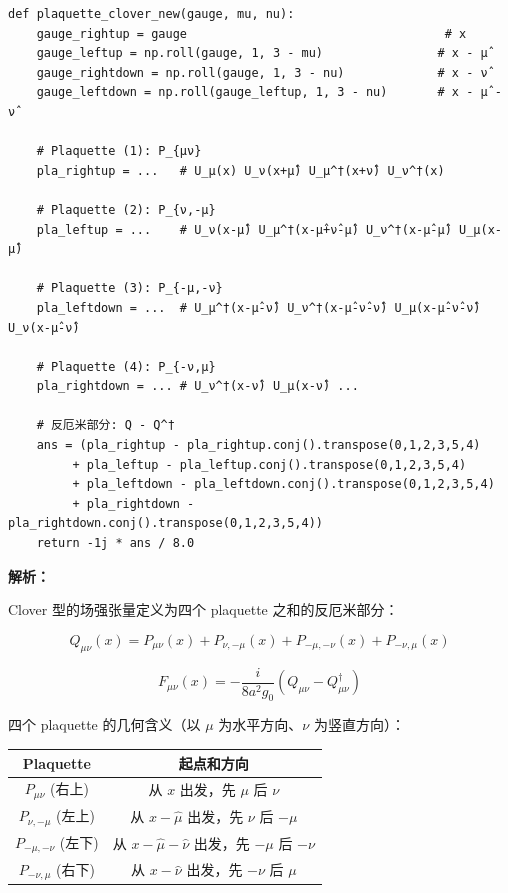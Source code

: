 \documentclass[12pt,a4paper]{ctexart}
\begin{document}
\begin{lstlisting}[caption={Clover 型 $F_{\mu\nu}$ 构造}]
def plaquette_clover_new(gauge, mu, nu):
    gauge_rightup = gauge                                    # x
    gauge_leftup = np.roll(gauge, 1, 3 - mu)                # x - μ̂
    gauge_rightdown = np.roll(gauge, 1, 3 - nu)             # x - ν̂
    gauge_leftdown = np.roll(gauge_leftup, 1, 3 - nu)       # x - μ̂ - ν̂

    # Plaquette (1): P_{μν}
    pla_rightup = ...   # U_μ(x) U_ν(x+μ̂) U_μ^†(x+ν̂) U_ν^†(x)

    # Plaquette (2): P_{ν,-μ}
    pla_leftup = ...    # U_ν(x-μ̂) U_μ^†(x-μ̂+ν̂-μ̂) U_ν^†(x-μ̂-μ̂) U_μ(x-μ̂)

    # Plaquette (3): P_{-μ,-ν}
    pla_leftdown = ...  # U_μ^†(x-μ̂-ν̂) U_ν^†(x-μ̂-ν̂-ν̂) U_μ(x-μ̂-ν̂-ν̂) U_ν(x-μ̂-ν̂)

    # Plaquette (4): P_{-ν,μ}
    pla_rightdown = ... # U_ν^†(x-ν̂) U_μ(x-ν̂) ...

    # 反厄米部分: Q - Q^†
    ans = (pla_rightup - pla_rightup.conj().transpose(0,1,2,3,5,4)
         + pla_leftup - pla_leftup.conj().transpose(0,1,2,3,5,4)
         + pla_leftdown - pla_leftdown.conj().transpose(0,1,2,3,5,4)
         + pla_rightdown - pla_rightdown.conj().transpose(0,1,2,3,5,4))
    return -1j * ans / 8.0
\end{lstlisting}

\textbf{解析：}

Clover 型的场强张量定义为四个 plaquette 之和的反厄米部分：

\begin{equation}
Q_{\mu\nu}(x) = P_{\mu\nu}(x) + P_{\nu,-\mu}(x) + P_{-\mu,-\nu}(x) + P_{-\nu,\mu}(x)
\end{equation}

\begin{equation}
F_{\mu\nu}(x) = -\frac{i}{8a^2 g_0}\left(Q_{\mu\nu} - Q_{\mu\nu}^\dagger\right)
\end{equation}

四个 plaquette 的几何含义（以 $\mu$ 为水平方向、$\nu$ 为竖直方向）：

\begin{center}
\begin{tabular}{cc}
\toprule
\textbf{Plaquette} & \textbf{起点和方向} \\
\midrule
$P_{\mu\nu}$ (右上)    & 从 $x$ 出发，先 $\mu$ 后 $\nu$ \\
$P_{\nu,-\mu}$ (左上)  & 从 $x-\hat{\mu}$ 出发，先 $\nu$ 后 $-\mu$ \\
$P_{-\mu,-\nu}$ (左下) & 从 $x-\hat{\mu}-\hat{\nu}$ 出发，先 $-\mu$ 后 $-\nu$ \\
$P_{-\nu,\mu}$ (右下)  & 从 $x-\hat{\nu}$ 出发，先 $-\nu$ 后 $\mu$ \\
\bottomrule
\end{tabular}
\end{center}
\end{document}
